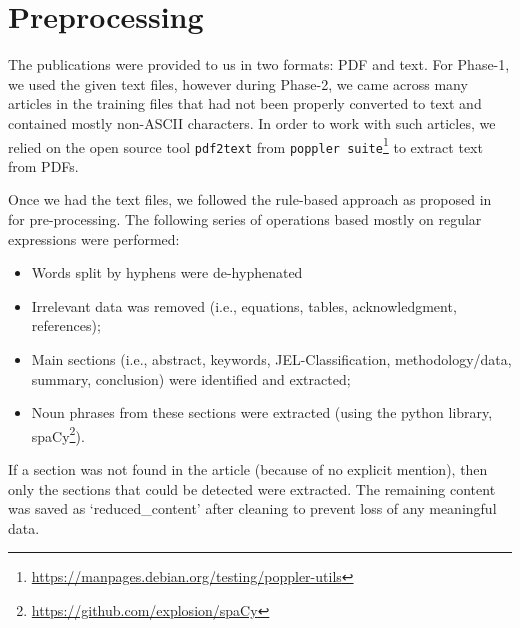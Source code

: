\documentclass[runningheads]{llncs}
\begin{document}
\section{Preprocessing} \label{preprocess}

The publications were provided to us in two formats: PDF and text. %
For Phase-1, we used the given text files, however during Phase-2, we came across many articles in the training files that had not been properly converted to text and contained mostly  non-ASCII characters. In order to work with such articles, we relied on the open source tool \texttt{pdf2text} from \texttt{poppler suite}\footnote{\label{poppler}\url{https://manpages.debian.org/testing/poppler-utils}} to extract text from PDFs. \\

\smallskip

Once we had the text files, we followed the rule-based approach as proposed %
in~\cite{DBLP:journals/ploscb/WestergaardSTJB18} for pre-processing. The following series of operations based mostly on regular expressions were performed:
\begin{itemize}
    \item Words split by hyphens were de-hyphenated %
    \item Irrelevant data was removed (i.e., equations, tables, acknowledgment, references);
    \item \raggedright Main sections (i.e., abstract, keywords,
    JEL-Classification, methodology/data, summary, conclusion) were identified and extracted;
    \item Noun phrases from these sections were extracted (using the python library, spaCy\footnote{\url{https://github.com/explosion/spaCy}}).
\end{itemize}


If a section was not found in the article (because of no explicit mention), then only the sections that could be detected were extracted. The remaining content was saved as %
`reduced\_content' after cleaning to prevent loss of any meaningful data. %
\end{document}
